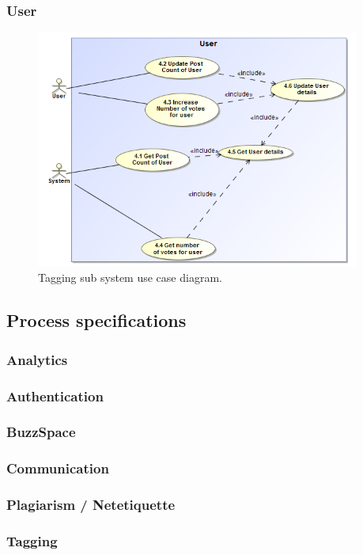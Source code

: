 \documentclass [a4paper,12pt] {article}
\begin{document}
		\subsubsection{User}
			\begin{figure}[H]
				\centering
				\includegraphics[width=0.95\textwidth]{USerUC.png}
				\caption{Tagging sub system use case diagram.}
			\end{figure}
\pagebreak
	\subsection{Process specifications}
		\subsubsection{Analytics}
		\subsubsection{Authentication}
		\subsubsection{BuzzSpace}
		\subsubsection{Communication}
		\subsubsection{Plagiarism / Netetiquette}
		\subsubsection{Tagging}
\end{document}
